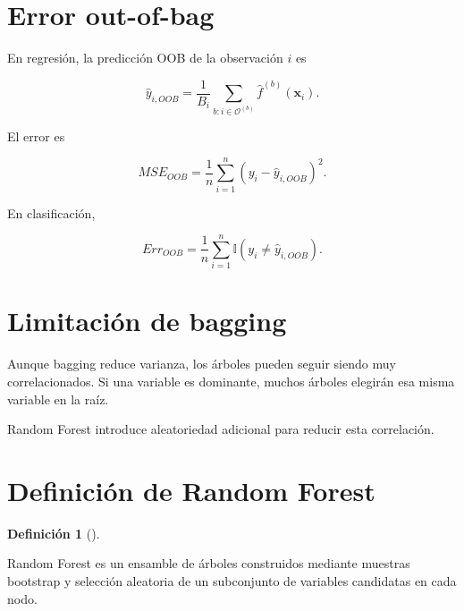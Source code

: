 \documentclass[
  spanish,
  10.5pt,
  letterpaper,
  DIV=11,
  numbers=noendperiod,
  oneside,
  open=any]{scrreprt}
\theoremstyle{definition}
\newtheorem{definition}{Definición}[chapter]
\theoremstyle{definition}
\theoremstyle{plain}
\theoremstyle{remark}
\begin{document}
\section*{Error out-of-bag}\label{error-out-of-bag-1}


En regresión, la predicción OOB de la observación \(i\) es

\[
\widehat{y}_{i,OOB}
=
\frac{1}{B_i}
\sum_{b:i\in\mathcal{O}^{(b)}}
\widehat{f}^{(b)}(\mathbf{x}_i).
\]

El error es

\[
MSE_{OOB}
=
\frac{1}{n}
\sum_{i=1}^{n}
\left(y_i-\widehat{y}_{i,OOB}\right)^2.
\]

En clasificación,

\[
Err_{OOB}
=
\frac{1}{n}
\sum_{i=1}^{n}
\mathbb{I}
\left(y_i\neq\widehat{y}_{i,OOB}\right).
\]

\section*{Limitación de bagging}\label{limitaciuxf3n-de-bagging}


Aunque bagging reduce varianza, los árboles pueden seguir siendo muy
correlacionados. Si una variable es dominante, muchos árboles elegirán
esa misma variable en la raíz.

Random Forest introduce aleatoriedad adicional para reducir esta
correlación.

\section*{Definición de Random
Forest}\label{definiciuxf3n-de-random-forest}


\begin{definition}[]\protect\hypertarget{def-random-forest}{}\label{def-random-forest}

Random Forest es un ensamble de árboles construidos mediante muestras
bootstrap y selección aleatoria de un subconjunto de variables
candidatas en cada nodo.

\end{definition}
\end{document}
